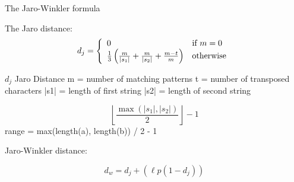 The Jaro-Winkler formula 


The Jaro distance:
\begin{equation}
  d_j = \left\{
  \begin{array}{l l}
    0 & \text{if }m = 0 \\ 
    \frac{1}{3}\left(\frac{m}{|s_1|} + \frac{m}{|s_2|} + \frac{m-t}{m}\right) & \text{otherwise} \end{array} \right.
\end{equation}

$ d_j $ Jaro Distance
m = number of matching patterns
t = number of transposed characters
|s1| = length of first string
|s2| = length of second string

\begin{equation}
  \left\lfloor\frac{\max(|s_1|,|s_2|)}{2}\right\rfloor-1
\end{equation}
range = max(length(a), length(b)) / 2 - 1


Jaro-Winkler distance:

\begin{equation}
  d_w = d_j + (\ell p (1 - d_j))
\end{equation}

